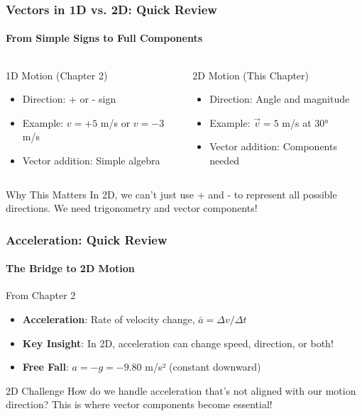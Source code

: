\documentclass{beamer}
\begin{document}
\begin{frame}
\frametitle{Vectors in 1D vs. 2D: Quick Review}
\framesubtitle{From Simple Signs to Full Components}
\begin{columns}[T]
    \begin{column}{0.5\textwidth}
        \alert{1D Motion (Chapter 2)}
        \begin{itemize}
            \item Direction: + or - sign
            \item Example: $v = +5$ m/s or $v = -3$ m/s
            \item Vector addition: Simple algebra
        \end{itemize}
    \end{column}
    \begin{column}{0.5\textwidth}
        \alert{2D Motion (This Chapter)}
        \begin{itemize}
            \item Direction: Angle and magnitude
            \item Example: $\vec{v} = 5$ m/s at 30°
            \item Vector addition: Components needed
        \end{itemize}
    \end{column}
\end{columns}
\vspace{1em}
\begin{block}{Why This Matters}
In 2D, we can't just use + and - to represent all possible directions. We need trigonometry and vector components!
\end{block}
\end{frame}

\begin{frame}
\frametitle{Acceleration: Quick Review}
\framesubtitle{The Bridge to 2D Motion}
\begin{block}{From Chapter 2}
\begin{itemize}
    \item \textbf{Acceleration}: Rate of velocity change, $\bar{a} = \Delta v / \Delta t$
    \item \textbf{Key Insight}: In 2D, acceleration can change speed, direction, or both!
    \item \textbf{Free Fall}: $a = -g = -9.80$ m/s² (constant downward)
\end{itemize}
\end{block}
\begin{alertblock}{2D Challenge}
How do we handle acceleration that's not aligned with our motion direction? This is where vector components become essential!
\end{alertblock}
\end{frame}
\end{document}
